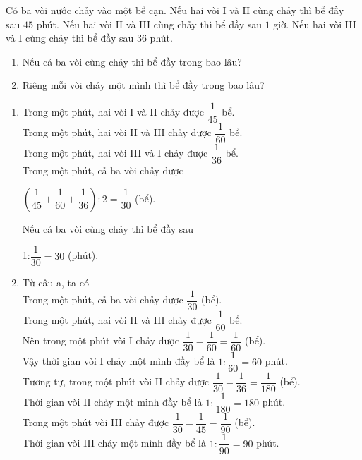 \begin{bt}%
	Có ba vòi nước chảy vào một bể cạn. Nếu hai vòi I và II cùng chảy thì bể đầy sau $45$ phút. Nếu hai vòi II và III cùng chảy thì bể đầy sau $1$ giờ. Nếu hai vòi III và I cùng chảy thì bể đầy sau $36$ phút.
	\begin{enumerate}
		\item Nếu cả ba vòi cùng chảy thì bể đầy trong bao lâu?
		\item Riêng mỗi vòi chảy một mình thì bể đầy trong bao lâu?
	\end{enumerate}
	\loigiai
	{
		\begin{enumerate}
			\item Trong một phút, hai vòi I và II chảy được $\dfrac{1}{45}$ bể.\\
			Trong một phút, hai vòi II và III chảy được $\dfrac{1}{60}$ bể.\\
			Trong một phút, hai vòi III và I chảy được $\dfrac{1}{36}$ bể.\\
			Trong một phút, cả ba vòi chảy được 
			\begin{center}
				$\left(\dfrac{1}{45}+\dfrac{1}{60}+\dfrac{1}{36}\right):2=\dfrac{1}{30}$ (bể).
			\end{center}
			Nếu cả ba vòi cùng chảy thì bể đầy sau
			\begin{center}
				1:$\dfrac{1}{30}=30$ (phút).
			\end{center}
			\item Từ câu a, ta có\\
			Trong một phút, cả ba vòi chảy được $\dfrac{1}{30}$ (bể).\\
			Trong một phút, hai vòi II và III chảy được $\dfrac{1}{60}$ bể.\\
			Nên trong một phút vòi I chảy được $\dfrac{1}{30}-\dfrac{1}{60}=\dfrac{1}{60}$ (bể). \\
			Vậy thời gian vòi I chảy một mình đầy bể là $1:\dfrac{1}{60}=60$ phút.\\
			Tương tự, trong một phút vòi II chảy được $\dfrac{1}{30}-\dfrac{1}{36}=\dfrac{1}{180}$ (bể).\\
			Thời gian vòi II chảy một mình đầy bể là $1:\dfrac{1}{180}=180$ phút.\\
			Trong một phút vòi III chảy được $\dfrac{1}{30}-\dfrac{1}{45}=\dfrac{1}{90}$ (bể).\\
			Thời gian vòi III chảy một mình đầy bể là $1:\dfrac{1}{90}=90$ phút.
		\end{enumerate}
	}
\end{bt}
